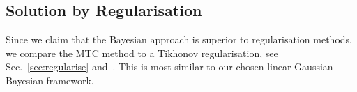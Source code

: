 

\subsection{Solution by Regularisation}
\label{sec:reg}
Since we claim that the Bayesian approach is superior to regularisation methods, we compare the MTC method to a Tikhonov regularisation, see Sec.~\ref{sec:regularise} and~\cite{fox2016fast}.
This is most similar to our chosen linear-Gaussian Bayesian framework.

